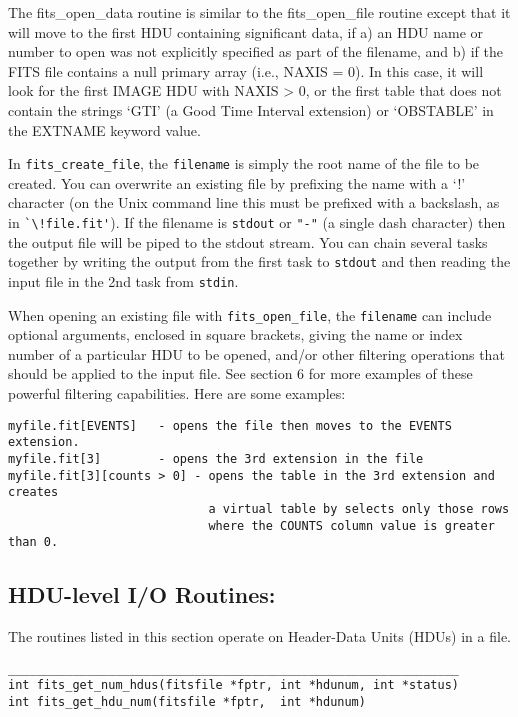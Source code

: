 \documentclass[11pt]{article}
\begin{document}
The fits\_open\_data routine is similar to the fits\_open\_file routine
except that it will move to the first HDU containing significant data,
if a) an HDU name or number to open was not explicitly specified as
part of the filename, and b) if the FITS file contains a null primary
array (i.e., NAXIS = 0).  In this case, it will look for the first
IMAGE HDU with NAXIS > 0, or the first table that does not contain the
strings `GTI' (a Good Time Interval extension) or `OBSTABLE' in the
EXTNAME keyword value.

In {\tt fits\_create\_file},  the {\tt filename} is simply the root name of
the file to be created.  You can overwrite an existing file by
prefixing the name with a `!' character (on the Unix command line this
must be prefixed with a backslash, as in \verb+`\!file.fit'+).  If the
filename is {\tt stdout} or {\tt "-"} (a single dash character)
then the output file will be piped to the stdout stream.  You can
chain several tasks together by writing the output from the first task
to {\tt stdout} and then reading the input file in the 2nd task from
{\tt stdin}.

When opening an existing file with {\tt fits\_open\_file}, the {\tt filename}
can include optional arguments, enclosed in square brackets, giving the
name or index number of a particular HDU to be opened, and/or other
filtering operations that should be applied to the input file.
See section 6 for more examples of these powerful filtering capabilities.
Here are some examples:

\begin{verbatim}
myfile.fit[EVENTS]   - opens the file then moves to the EVENTS extension.
myfile.fit[3]        - opens the 3rd extension in the file
myfile.fit[3][counts > 0] - opens the table in the 3rd extension and creates
                            a virtual table by selects only those rows 
                            where the COUNTS column value is greater than 0.
\end{verbatim}


\subsection{HDU-level I/O Routines:}

The routines listed in this section operate on Header-Data Units (HDUs) in a file.

\begin{verbatim}
_______________________________________________________________
int fits_get_num_hdus(fitsfile *fptr, int *hdunum, int *status)
int fits_get_hdu_num(fitsfile *fptr,  int *hdunum)
\end{verbatim}
\end{document}

